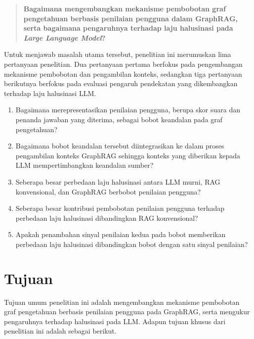 \begin{quote}
\textbf{Bagaimana mengembangkan mekanisme pembobotan graf pengetahuan berbasis penilaian pengguna dalam GraphRAG, serta bagaimana pengaruhnya terhadap laju halusinasi pada \emph{Large Language Model}?}
\end{quote}

Untuk menjawab masalah utama tersebut, penelitian ini merumuskan lima pertanyaan penelitian. Dua pertanyaan pertama berfokus pada pengembangan mekanisme pembobotan dan pengambilan konteks, sedangkan tiga pertanyaan berikutnya berfokus pada evaluasi pengaruh pendekatan yang dikembangkan terhadap laju halusinasi LLM.

\begin{enumerate}
    \item Bagaimana merepresentasikan penilaian pengguna, berupa skor suara dan penanda jawaban yang diterima, sebagai bobot keandalan pada graf pengetahuan?

    \item Bagaimana bobot keandalan tersebut diintegrasikan ke dalam proses pengambilan konteks GraphRAG sehingga konteks yang diberikan kepada LLM mempertimbangkan keandalan sumber?

    \item Seberapa besar perbedaan laju halusinasi antara LLM murni, RAG konvensional, dan GraphRAG berbobot penilaian pengguna?

    \item Seberapa besar kontribusi pembobotan penilaian pengguna terhadap perbedaan laju halusinasi dibandingkan RAG konvensional?

    \item Apakah penambahan sinyal penilaian kedua pada bobot memberikan perbedaan laju halusinasi dibandingkan bobot dengan satu sinyal penilaian?
\end{enumerate}

\section{Tujuan}
\label{sec:tujuan}

Tujuan umum penelitian ini adalah mengembangkan mekanisme pembobotan graf pengetahuan berbasis penilaian pengguna pada GraphRAG, serta mengukur pengaruhnya terhadap halusinasi pada LLM. Adapun tujuan khusus dari penelitian ini adalah sebagai berikut.


